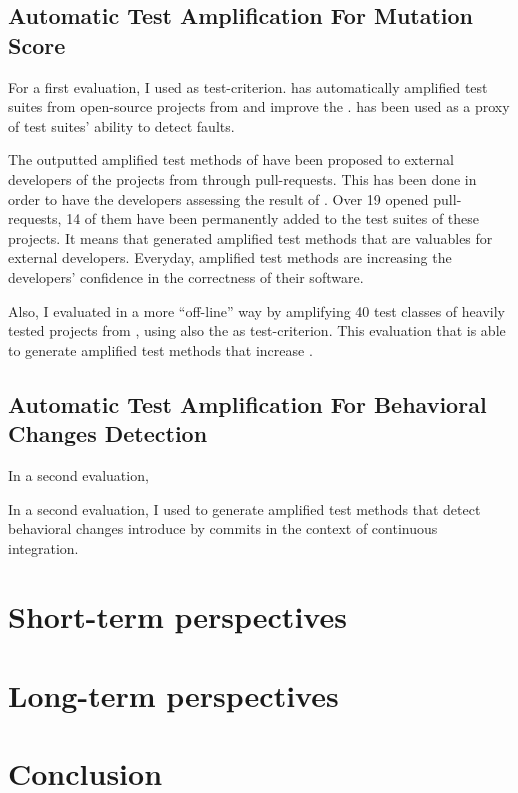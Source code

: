 \subsection{Automatic Test Amplification For Mutation Score}
\label{subsec:conclusion:contributions-summary:test-ampl-ms}

For a first evaluation, I used \ms as test-criterion.
\dspot has automatically amplified test suites from open-source projects from \gh and improve the \ms.
\ms has been used as a proxy of test suites' ability to detect faults.

The outputted amplified test methods of \dspot have been proposed to external developers of the projects from \gh through pull-requests.
This has been done in order to have the developers assessing the result of \dspot.
Over 19 opened pull-requests, 14 of them have been permanently added to the test suites of these projects.
It means that \dspot generated amplified test methods that are valuables for external developers.
Everyday, amplified test methods are increasing the developers' confidence in the correctness of their software.

Also, I evaluated \dspot in a more ``off-line'' way by amplifying 40 test classes of heavily tested projects from \gh, using also the \ms as test-criterion.
This evaluation that \dspot is able to generate amplified test methods that increase \ms.

\subsection{Automatic Test Amplification For Behavioral Changes Detection}
\label{subsec:conclusion:contributions-summary:behavioral-change-detection}

In a second evaluation, 

In a second evaluation, I used \dspot to generate amplified test methods that detect behavioral changes introduce by commits in the context of continuous integration.



\section{Short-term perspectives}
\label{sec:conclusion:short-prespectives}

\section{Long-term perspectives}
\label{sec:conclusion:long-prespectives}

\section{Conclusion}
\label{sec:conclusion:conclusion}


